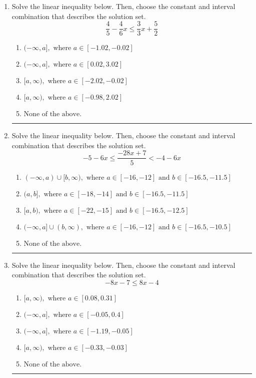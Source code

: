 \documentclass[14pt]{extbook}
\newcommand{\litem}[1]{\item#1\hspace*{-1cm}\rule{\textwidth}{0.4pt}}
\begin{document}
\begin{enumerate}
{\begin{enumerate}[label=\Alph*.]
\end{enumerate} }
\litem{
Solve the linear inequality below. Then, choose the constant and interval combination that describes the solution set.\[ \frac{4}{5} - \frac{4}{6} x \leq \frac{3}{3} x + \frac{5}{2} \]\begin{enumerate}[label=\Alph*.]
\item \( (-\infty, a], \text{ where } a \in [-1.02, -0.02] \)
\item \( (-\infty, a], \text{ where } a \in [0.02, 3.02] \)
\item \( [a, \infty), \text{ where } a \in [-2.02, -0.02] \)
\item \( [a, \infty), \text{ where } a \in [-0.98, 2.02] \)
\item \( \text{None of the above}. \)

\end{enumerate} }
\litem{
Solve the linear inequality below. Then, choose the constant and interval combination that describes the solution set.\[ -5 - 6 x \leq \frac{-28 x + 7}{5} < -4 - 6 x \]\begin{enumerate}[label=\Alph*.]
\item \( (-\infty, a) \cup [b, \infty), \text{ where } a \in [-16, -12] \text{ and } b \in [-16.5, -11.5] \)
\item \( (a, b], \text{ where } a \in [-18, -14] \text{ and } b \in [-16.5, -11.5] \)
\item \( [a, b), \text{ where } a \in [-22, -15] \text{ and } b \in [-16.5, -12.5] \)
\item \( (-\infty, a] \cup (b, \infty), \text{ where } a \in [-16, -12] \text{ and } b \in [-16.5, -10.5] \)
\item \( \text{None of the above.} \)

\end{enumerate} }
\litem{
Solve the linear inequality below. Then, choose the constant and interval combination that describes the solution set.\[ -8x -7 \leq 8x -4 \]\begin{enumerate}[label=\Alph*.]
\item \( [a, \infty), \text{ where } a \in [0.08, 0.31] \)
\item \( (-\infty, a], \text{ where } a \in [-0.05, 0.4] \)
\item \( (-\infty, a], \text{ where } a \in [-1.19, -0.05] \)
\item \( [a, \infty), \text{ where } a \in [-0.33, -0.03] \)
\item \( \text{None of the above}. \)


\end{enumerate}}
\end{enumerate}
\end{document}

